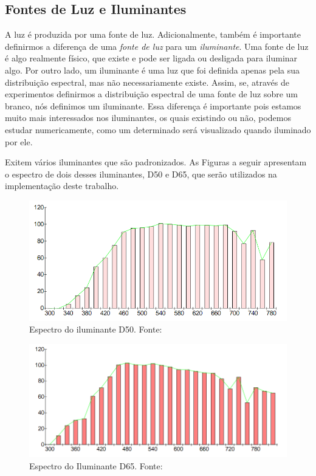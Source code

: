 \documentclass[a4paper,10pt]{report}
\begin{document}
\subsection{Fontes de Luz e Iluminantes}
\par
A luz é produzida por uma fonte de luz. Adicionalmente, também é importante
definirmos a diferença de uma \textit{fonte de luz} para um \textit{iluminante}.
Uma fonte de luz é algo realmente físico, que existe e pode ser ligada ou
desligada para iluminar algo. Por outro lado, um iluminante é uma luz que foi
definida apenas pela sua distribuição espectral, mas não necessariamente existe.
Assim, se, através de experimentos definirmos a distribuição espectral de uma
fonte de luz sobre um branco, nós definimos um iluminante. Essa diferença é
importante pois estamos muito mais interessados nos iluminantes, os quais
existindo ou não, podemos estudar numericamente, como um determinado será
visualizado quando iluminado por ele.

\par
Exitem vários iluminantes que são padronizados. As Figuras a seguir apresentam
o espectro de dois desses iluminantes, D50 e D65, que serão utilizados na
implementação deste trabalho.

\begin{figure}[!htb]
     \centering
     \includegraphics[scale=0.6]{img/illuminant_d50.png}
     \caption{Espectro do iluminante D50. Fonte:
}
     \label{fig:illuminant_d50}
\end{figure}

\begin{figure}[!htb]
     \centering
     \includegraphics[scale=0.6]{img/illuminant_d65.png}
     \caption{Espectro do Iluminante D65. Fonte:
}
     \label{fig:illuminant_d65}
\end{figure}
\end{document}
